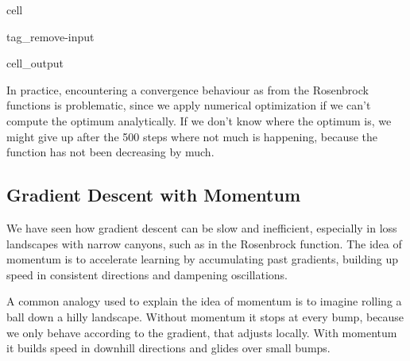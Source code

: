 \documentclass[letterpaper,10pt,english]{jupyterBook}
\begin{document}
\begin{sphinxuseclass}{cell}
\begin{sphinxuseclass}{tag_remove-input}\begin{sphinxVerbatimOutput}

\begin{sphinxuseclass}{cell_output}
\noindent{}

\end{sphinxuseclass}\end{sphinxVerbatimOutput}

\end{sphinxuseclass}
\end{sphinxuseclass}
\sphinxAtStartPar
In practice, encountering a convergence behaviour as from the Rosenbrock functions is problematic, since we apply numerical optimization if we can’t compute the optimum analytically. If we don’t know where the optimum is, we might give up after the 500 steps where not much is happening, because the function has not been decreasing by much.


\subsection{Gradient Descent with Momentum}
\label{\detokenize{optimization_numerical:gradient-descent-with-momentum}}
\sphinxAtStartPar
We have seen how gradient descent can be slow and inefficient, especially in loss landscapes with narrow canyons, such as in the Rosenbrock function. The idea of momentum is to accelerate learning by accumulating past gradients, building up speed in consistent directions and dampening oscillations.

\sphinxAtStartPar
A common analogy used to explain the idea of momentum is to imagine rolling a ball down a hilly landscape. Without momentum it stops at every bump, because we only behave according to the gradient, that adjusts locally. With momentum it builds speed in downhill directions and glides over small bumps.
\end{document}
